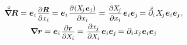 \nopagebreak\vspace{-0.4em}\begin{equation*}
\begin{array}{c}
\boldnablacircled \hspace{-0.16ex} \bm{R}
= \bm{e}_i \hspace{.2ex} \scalebox{.9}{$ \displaystyle \frac{\raisemath{-0.2em}{\partial \bm{R}}}{\partial x_i} $} \hspace{-0.1ex}
= \bm{e}_i \hspace{.2ex} \scalebox{.9}{$ \displaystyle \frac{\raisemath{-0.2em}{\partial \hspace{.1ex} ( \hspace{-0.1ex} X_{\hspace{-0.3ex}j} \hspace{.2ex} \bm{e}_j )}}{\partial x_i} $}
=  \hspace{.2ex} \scalebox{.9}{$ \displaystyle \frac{\raisemath{-0.2em}{\partial \hspace{-0.1ex} X_{\hspace{-0.3ex}j}}}{\partial x_i} $} \hspace{.25ex} \bm{e}_i \bm{e}_{\hspace{-0.1ex}j} \hspace{-0.2ex}
= \mathcircabove{\partial}_i \hspace{.1ex} X_{\hspace{-0.3ex}j} \hspace{.1ex} \bm{e}_i \bm{e}_{\hspace{-0.1ex}j}
\hspace{.1ex} ,
\\[.66em]
%
\boldnabla \bm{r}
= \bm{e}_i \hspace{.2ex} \scalebox{.9}{$ \displaystyle \frac{\raisemath{-0.2em}{\partial \bm{r}}}{\partial \hspace{-0.1ex} X_{\hspace{-0.1ex}i}} $} \hspace{-0.1ex}
= \hspace{.2ex} \scalebox{.9}{$ \displaystyle \frac{\raisemath{-0.2em}{\partial x_{\hspace{-0.2ex}j}}}{\partial \hspace{-0.1ex} X_{\hspace{-0.1ex}i}} $} \hspace{.25ex} \bm{e}_i \bm{e}_{\hspace{-0.1ex}j} \hspace{-0.2ex}
= \partial_i \hspace{.1ex} x_{\hspace{-0.2ex}j} \hspace{.1ex} \bm{e}_i \bm{e}_{\hspace{-0.1ex}j}
\end{array}
\end{equation*}

